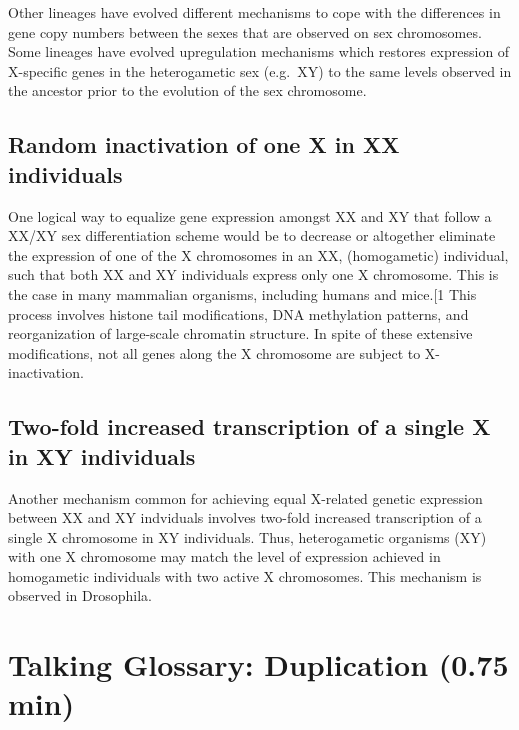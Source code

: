 \documentclass[
]{book}
\begin{document}
Other lineages have evolved different mechanisms to cope with the differences in gene copy numbers between the sexes that are observed on sex chromosomes. Some lineages have evolved upregulation mechanisms which restores expression of X-specific genes in the heterogametic sex (e.g.~XY) to the same levels observed in the ancestor prior to the evolution of the sex chromosome.

\hypertarget{random-inactivation-of-one-x-in-xx-individuals}{%
\subsection{Random inactivation of one X in XX individuals}\label{random-inactivation-of-one-x-in-xx-individuals}}

One logical way to equalize gene expression amongst XX and XY that follow a XX/XY sex differentiation scheme would be to decrease or altogether eliminate the expression of one of the X chromosomes in an XX, (homogametic) individual, such that both XX and XY individuals express only one X chromosome. This is the case in many mammalian organisms, including humans and mice.{[}1 This process involves histone tail modifications, DNA methylation patterns, and reorganization of large-scale chromatin structure. In spite of these extensive modifications, not all genes along the X chromosome are subject to X-inactivation.

\hypertarget{two-fold-increased-transcription-of-a-single-x-in-xy-individuals}{%
\subsection{Two-fold increased transcription of a single X in XY individuals}\label{two-fold-increased-transcription-of-a-single-x-in-xy-individuals}}

Another mechanism common for achieving equal X-related genetic expression between XX and XY indviduals involves two-fold increased transcription of a single X chromosome in XY individuals. Thus, heterogametic organisms (XY) with one X chromosome may match the level of expression achieved in homogametic individuals with two active X chromosomes. This mechanism is observed in Drosophila.

\hypertarget{talking-glossary-duplication-0.75-min}{%
\section{Talking Glossary: Duplication (0.75 min)}\label{talking-glossary-duplication-0.75-min}}
\end{document}
